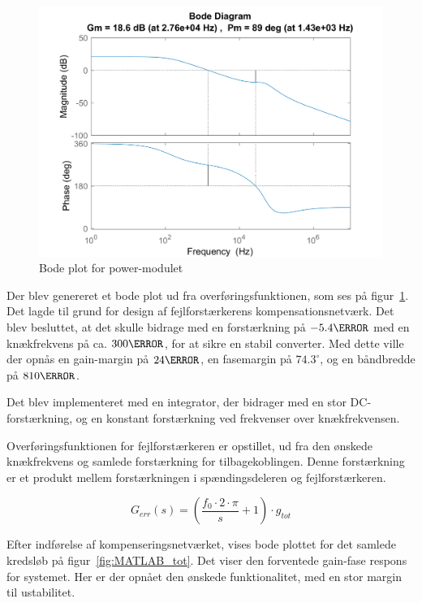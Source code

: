 \begin{figure}[H]
	\center
	\includegraphics[max width=0.7\linewidth]{../dokumentation/tex/2iteration/billeder/MATLAB_power_module.PNG}
	\caption{Bode plot for power-modulet}
	\label{fig:MATLAB_power_module}
\end{figure}

\noindent Der blev genereret et bode plot ud fra overføringsfunktionen, som ses på figur~\ref{fig:MATLAB_power_module}. Det lagde til grund for design af fejlforstærkerens kompensationsnetværk. Det blev besluttet, at det skulle bidrage med en forstærkning på $-5.4\decibel$ med en knækfrekvens på ca. $300\hertz$, for at sikre en stabil converter. Med dette ville der opnås en gain-margin på $24\decibel$, en fasemargin på $74.3^\circ$, og en båndbredde på $810\hertz$.

Det blev implementeret med en integrator, der bidrager med en stor DC-forstærkning, og en konstant forstærkning ved frekvenser over knækfrekvensen. 

Overføringsfunktionen for fejlforstærkeren er opstillet, ud fra den ønskede knækfrekvens og samlede forstærkning for tilbagekoblingen. Denne forstærkning er et produkt mellem forstærkningen i spændingsdeleren og fejlforstærkeren. 

\begin{equation} \label{H_err}
G_{err}(s) = \left(\frac{f_0 \cdot 2\cdot\pi}{s} + 1\right)  \cdot g_{tot}
\end{equation}

Efter indførelse af kompenseringsnetværket, vises bode plottet for det samlede kredsløb på figur~\ref{fig:MATLAB_tot}. Det viser den forventede gain-fase respons for systemet. Her er der opnået den ønskede funktionalitet, med en stor margin til ustabilitet. 

